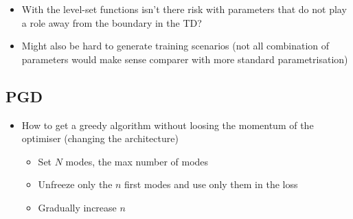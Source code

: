\begin{itemize}
	\item With the level-set functions isn't there risk with parameters that do not play a role away from the boundary in the TD?
	\item Might also be hard to generate training scenarios (not all combination of parameters would make sense comparer with more standard parametrisation)
\end{itemize}


\subsection{PGD}

\begin{itemize}
	\item How to get a greedy algorithm without loosing the momentum of the optimiser (changing the architecture)
	\begin{itemize}
		\item Set $N$ modes, the max number of modes
		\item Unfreeze only the $n$ first modes and use only them in the loss
		\item Gradually increase $n$
	\end{itemize}
\end{itemize}

